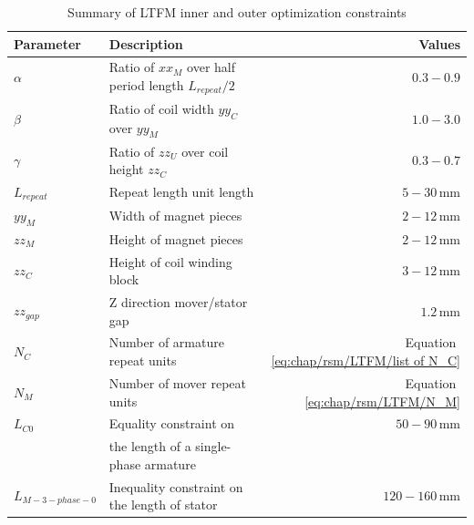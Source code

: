     
                \begin{table}[h]
                    \renewcommand{\arraystretch}{1.2}
                    \caption{Summary of \acs{LTFM} inner and outer optimization constraints}
                    \label{table:chap/rsm/LTFM/inner and outer constraints}
                    \centering
                    \begin{tabular}{@{}llr@{}}
                    \hline
                    \bfseries Parameter & \bfseries Description & \bfseries Values\\
                    \hline
                        $\alpha$	    & Ratio of $xx_M$ over half period length $L_{repeat}/2$  &	$0.3-0.9$\\ 
                        $\beta$	        & Ratio of coil width $yy_C$ over $yy_M$	&	$1.0-3.0$\\ 
                        $\gamma$	    & Ratio of $zz_U$ over coil height	$zz_C$	&	$0.3-0.7$\\ 
                        $L_{repeat}$    & Repeat length unit length                 &   $5-30\,\mathrm{mm}$\\
                        $yy_M$	        & Width of magnet pieces 	                &	$2-12\,\mathrm{mm}$\\ 
                        $zz_M$	        & Height of magnet pieces			        &	$2-12\,\mathrm{mm}$\\ 
                        $zz_C$	        & Height of coil winding block 			    &	$3-12\,\mathrm{mm}$\\ 
                        $zz_{gap}$      & Z direction mover/stator gap              &	$1.2\,\mathrm{mm}$\\ 
                        \hline
                        $N_C$	        & Number of armature repeat units 		    &	Equation\,\,\ref{eq:chap/rsm/LTFM/list of N_C} \\ 
                        $N_M$	        & Number of mover repeat units 		        &	Equation\,\,\ref{eq:chap/rsm/LTFM/N_M}\\ 
                        $L_{C0}$	    & Equality constraint on 		            &	$50-90\,\mathrm{mm}$\\ 
                                        & \quad the length of a single-phase armature       &   \\
                        $L_{M-3-phase-0}$	    & Inequality constraint on the length of stator &	$120-160\,\mathrm{mm}$\\
                    \hline
                    \end{tabular}
                \end{table}
    
